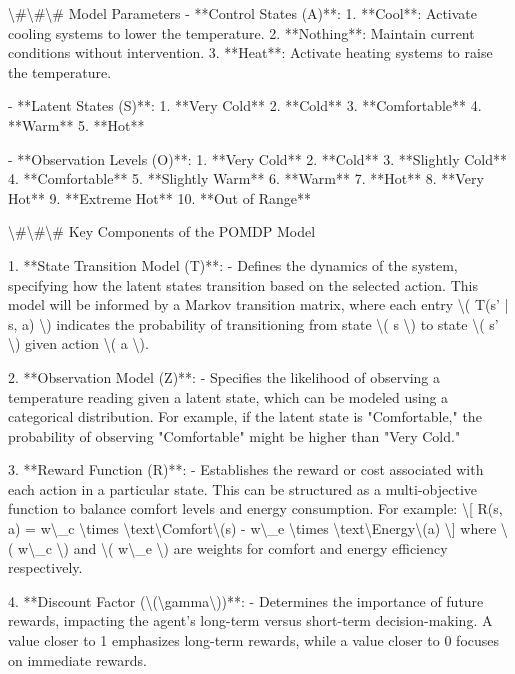 \documentclass[11pt,a4paper]{article}
\begin{document}
\textbackslash{}#\textbackslash{}#\textbackslash{}# Model Parameters
- **Control States (A)**: 
  1. **Cool**: Activate cooling systems to lower the temperature.
  2. **Nothing**: Maintain current conditions without intervention.
  3. **Heat**: Activate heating systems to raise the temperature.

- **Latent States (S)**: 
  1. **Very Cold**
  2. **Cold**
  3. **Comfortable**
  4. **Warm**
  5. **Hot**

- **Observation Levels (O)**: 
  1. **Very Cold**
  2. **Cold**
  3. **Slightly Cold**
  4. **Comfortable**
  5. **Slightly Warm**
  6. **Warm**
  7. **Hot**
  8. **Very Hot**
  9. **Extreme Hot**
  10. **Out of Range**

\textbackslash{}#\textbackslash{}#\textbackslash{}# Key Components of the POMDP Model

1. **State Transition Model (T)**: 
   - Defines the dynamics of the system, specifying how the latent states transition based on the selected action. This model will be informed by a Markov transition matrix, where each entry \textbackslash{}( T(s' | s, a) \textbackslash{}) indicates the probability of transitioning from state \textbackslash{}( s \textbackslash{}) to state \textbackslash{}( s' \textbackslash{}) given action \textbackslash{}( a \textbackslash{}).

2. **Observation Model (Z)**: 
   - Specifies the likelihood of observing a temperature reading given a latent state, which can be modeled using a categorical distribution. For example, if the latent state is "Comfortable," the probability of observing "Comfortable" might be higher than "Very Cold."

3. **Reward Function (R)**: 
   - Establishes the reward or cost associated with each action in a particular state. This can be structured as a multi-objective function to balance comfort levels and energy consumption. For example:
     \textbackslash{}[
     R(s, a) = w\textbackslash{}_c \textbackslash{}times \textbackslash{}text\textbackslash{}{Comfort\textbackslash{}}(s) - w\textbackslash{}_e \textbackslash{}times \textbackslash{}text\textbackslash{}{Energy\textbackslash{}}(a)
     \textbackslash{}]
     where \textbackslash{}( w\textbackslash{}_c \textbackslash{}) and \textbackslash{}( w\textbackslash{}_e \textbackslash{}) are weights for comfort and energy efficiency respectively.

4. **Discount Factor (\textbackslash{}(\textbackslash{}gamma\textbackslash{}))**: 
   - Determines the importance of future rewards, impacting the agent's long-term versus short-term decision-making. A value closer to 1 emphasizes long-term rewards, while a value closer to 0 focuses on immediate rewards.
\end{document}
